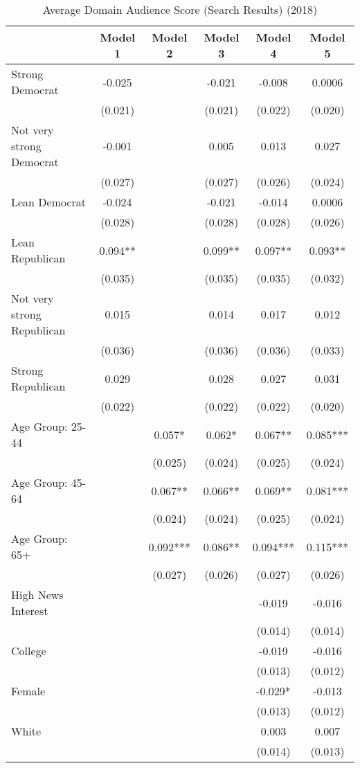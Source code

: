 \begin{table}

\caption{Average Domain Audience Score (Search Results) (2018)}
\centering
\begin{tabular}[t]{lccccc}
\toprule
  & Model 1 & Model 2 & Model 3 & Model 4 & Model 5\\
\midrule
Strong Democrat & -0.025 &  & -0.021 & -0.008 & 0.0006\\
 & (0.021) &  & (0.021) & (0.022) & (0.020)\\
Not very strong Democrat & -0.001 &  & 0.005 & 0.013 & 0.027\\
 & (0.027) &  & (0.027) & (0.026) & (0.024)\\
Lean Democrat & -0.024 &  & -0.021 & -0.014 & 0.0006\\
 & (0.028) &  & (0.028) & (0.028) & (0.026)\\
Lean Republican & 0.094** &  & 0.099** & 0.097** & 0.093**\\
 & (0.035) &  & (0.035) & (0.035) & (0.032)\\
Not very strong Republican & 0.015 &  & 0.014 & 0.017 & 0.012\\
 & (0.036) &  & (0.036) & (0.036) & (0.033)\\
Strong Republican & 0.029 &  & 0.028 & 0.027 & 0.031\\
 & (0.022) &  & (0.022) & (0.022) & (0.020)\\
Age Group: 25-44 &  & 0.057* & 0.062* & 0.067** & 0.085***\\
 &  & (0.025) & (0.024) & (0.025) & (0.024)\\
Age Group: 45-64 &  & 0.067** & 0.066** & 0.069** & 0.081***\\
 &  & (0.024) & (0.024) & (0.025) & (0.024)\\
Age Group: 65+ &  & 0.092*** & 0.086** & 0.094*** & 0.115***\\
 &  & (0.027) & (0.026) & (0.027) & (0.026)\\
High News Interest &  &  &  & -0.019 & -0.016\\
 &  &  &  & (0.014) & (0.014)\\
College &  &  &  & -0.019 & -0.016\\
 &  &  &  & (0.013) & \vphantom{1} (0.012)\\
Female &  &  &  & -0.029* & -0.013\\
 &  &  &  & (0.013) & (0.012)\\
White &  &  &  & 0.003 & 0.007\\
 &  &  &  & (0.014) & (0.013)\\

\end{tabular}
\end{table}
